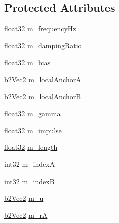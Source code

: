 \subsection*{Protected Attributes}
\begin{DoxyCompactItemize}
\item 
\mbox{\hyperlink{b2_settings_8h_aacdc525d6f7bddb3ae95d5c311bd06a1}{float32}} \mbox{\hyperlink{classb2_distance_joint_a90327211c322fa19ea7b8c58d0c27ea8}{m\+\_\+frequency\+Hz}}
\item 
\mbox{\hyperlink{b2_settings_8h_aacdc525d6f7bddb3ae95d5c311bd06a1}{float32}} \mbox{\hyperlink{classb2_distance_joint_a1339d37474c5e66cd4f66d42e9440307}{m\+\_\+damping\+Ratio}}
\item 
\mbox{\hyperlink{b2_settings_8h_aacdc525d6f7bddb3ae95d5c311bd06a1}{float32}} \mbox{\hyperlink{classb2_distance_joint_a91f829c0a95e0d5f204a512a506e29f0}{m\+\_\+bias}}
\item 
\mbox{\hyperlink{structb2_vec2}{b2\+Vec2}} \mbox{\hyperlink{classb2_distance_joint_a297938125dd60175ab07921d5ecc43a8}{m\+\_\+local\+AnchorA}}
\item 
\mbox{\hyperlink{structb2_vec2}{b2\+Vec2}} \mbox{\hyperlink{classb2_distance_joint_ad4c94a5b939ca4c3244bbab8544b880e}{m\+\_\+local\+AnchorB}}
\item 
\mbox{\hyperlink{b2_settings_8h_aacdc525d6f7bddb3ae95d5c311bd06a1}{float32}} \mbox{\hyperlink{classb2_distance_joint_a0ca755fb59c838c59d0ad162af8ab484}{m\+\_\+gamma}}
\item 
\mbox{\hyperlink{b2_settings_8h_aacdc525d6f7bddb3ae95d5c311bd06a1}{float32}} \mbox{\hyperlink{classb2_distance_joint_a75713391126d712f728d1a4f33b32a9f}{m\+\_\+impulse}}
\item 
\mbox{\hyperlink{b2_settings_8h_aacdc525d6f7bddb3ae95d5c311bd06a1}{float32}} \mbox{\hyperlink{classb2_distance_joint_a11b4805df34c380f53c3c346dd33da6c}{m\+\_\+length}}
\item 
\mbox{\hyperlink{b2_settings_8h_a43d43196463bde49cb067f5c20ab8481}{int32}} \mbox{\hyperlink{classb2_distance_joint_abcae00902974ed826f70aa119c2fd9de}{m\+\_\+indexA}}
\item 
\mbox{\hyperlink{b2_settings_8h_a43d43196463bde49cb067f5c20ab8481}{int32}} \mbox{\hyperlink{classb2_distance_joint_a465f7f1b609bcb37be732cde71b6d8c8}{m\+\_\+indexB}}
\item 
\mbox{\hyperlink{structb2_vec2}{b2\+Vec2}} \mbox{\hyperlink{classb2_distance_joint_a78f45f86d3cf68701a0871e9de71fcd0}{m\+\_\+u}}
\item 
\mbox{\hyperlink{structb2_vec2}{b2\+Vec2}} \mbox{\hyperlink{classb2_distance_joint_af046e84218d249f9234a16ecab95bac0}{m\+\_\+rA}}

\end{DoxyCompactItemize}
